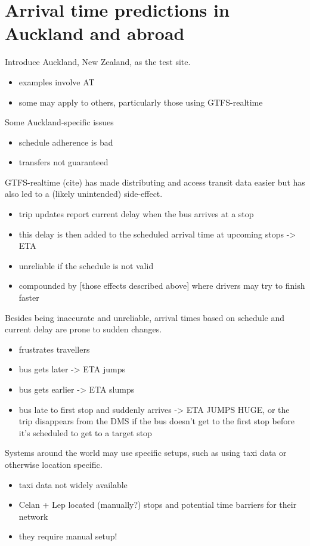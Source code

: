 \section{Arrival time predictions in Auckland and abroad}

Introduce Auckland, New Zealand, as the test site.
\begin{itemize}
\item examples involve AT
\item some may apply to others, particularly those using GTFS-realtime
\end{itemize}

Some Auckland-specific issues
\begin{itemize}
\item schedule adherence is bad
\item transfers not guaranteed
\end{itemize}

GTFS-realtime (cite) has made distributing and access transit data easier but has also led to a (likely unintended) side-effect.
\begin{itemize}
\item trip updates report current delay when the bus arrives at a stop
\item this delay is then added to the scheduled arrival time at upcoming stops -> ETA
\item unreliable if the schedule is not valid
\item compounded by [those effects described above] where drivers may try to finish faster
\end{itemize}

Besides being inaccurate and unreliable, arrival times based on schedule and current delay are prone to sudden changes.
\begin{itemize}
\item frustrates travellers
\item bus gets later -> ETA jumps
\item bus gets earlier -> ETA slumps
\item bus late to first stop and suddenly arrives -> ETA JUMPS HUGE, or the trip disappears from the DMS if the bus doesn't get to the first stop before it's scheduled to get to a target stop
\end{itemize}

Systems around the world may use specific setups, such as using taxi data or otherwise location specific.
\begin{itemize}
\item taxi data not widely available
\item Celan + Lep located (manually?) stops and potential time barriers for their network
\item they require manual setup!
\end{itemize}

